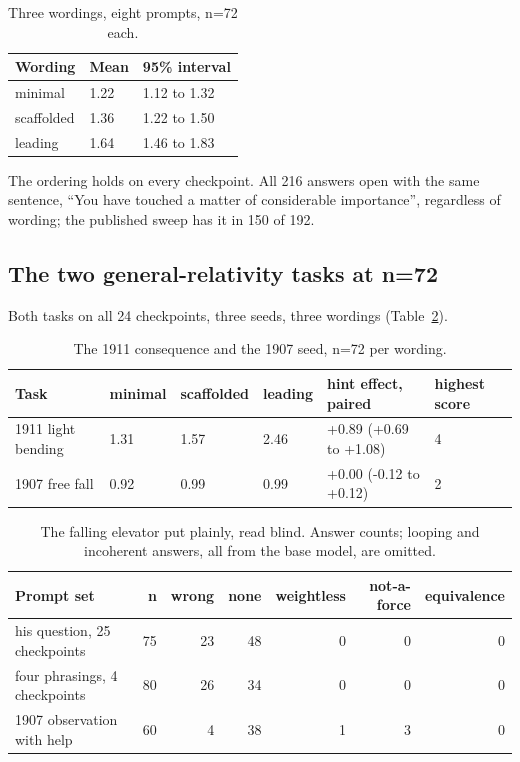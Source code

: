 \documentclass[reprint,prx,amsmath,amssymb,aps,superscriptaddress]{revtex4-2}
\begin{document}
\begin{table}[t]
\caption{Three wordings, eight prompts, n=72 each.}
\label{tab:wording}
\begin{ruledtabular}
\begin{tabular}{lll}
Wording & Mean & 95\% interval \\
\hline
minimal & 1.22 & 1.12 to 1.32 \\
scaffolded & 1.36 & 1.22 to 1.50 \\
leading & 1.64 & 1.46 to 1.83 \\
\end{tabular}
\end{ruledtabular}
\end{table}

The ordering holds on every checkpoint. All 216 answers open with the same sentence, ``You have touched a matter of considerable importance'', regardless of wording; the published sweep has it in 150 of 192.

\subsection{The two general-relativity tasks at n=72}

Both tasks on all 24 checkpoints, three seeds, three wordings (Table~\ref{tab:gr}).

\begin{table}[t]
\caption{The 1911 consequence and the 1907 seed, n=72 per wording.}
\label{tab:gr}
\begin{ruledtabular}
\begin{tabular}{llllll}
Task & minimal & scaffolded & leading & hint effect, paired & highest score \\
\hline
1911 light bending & 1.31 & 1.57 & 2.46 & +0.89 (+0.69 to +1.08) & 4 \\
1907 free fall & 0.92 & 0.99 & 0.99 & +0.00 (-0.12 to +0.12) & 2 \\
\end{tabular}
\end{ruledtabular}
\end{table}

\begin{table}[t]
\caption{The falling elevator put plainly, read blind. Answer counts; looping and incoherent answers, all from the base model, are omitted.}
\label{tab:elev}
\begin{ruledtabular}
\begin{tabular}{lrrrrrr}
Prompt set & n & wrong & none & weightless & not-a-force & equivalence \\
\hline
his question, 25 checkpoints & 75 & 23 & 48 & 0 & 0 & 0 \\
four phrasings, 4 checkpoints & 80 & 26 & 34 & 0 & 0 & 0 \\
1907 observation with help & 60 & 4 & 38 & 1 & 3 & 0 \\
\end{tabular}
\end{ruledtabular}
\end{table}
\end{document}
